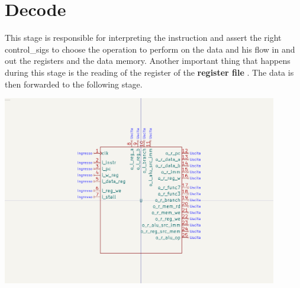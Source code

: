 \documentclass{article}
\begin{document}
\section{Decode}\label{DECODE}
\begin{minipage}{0.48\textwidth}
This stage is responsible for interpreting the instruction and assert the right \glspl{control_sig} 
to choose the operation to perform on the data and his flow in and out the registers and the data memory.
Another important thing that happens during this stage is the reading of the register 
of the \textbf{register file} . The data is then forwarded to the following stage.
\end{minipage}
\begin{minipage}{0.48\textwidth}
  \includegraphics[width=0.9\textwidth,right,trim={400 150 400 150},clip]{components/Decode.png}
\end{minipage}
\end{document}
